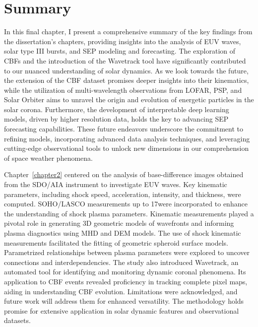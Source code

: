 \chapter{Summary}
\label{chapter5}
In this final chapter, I present a comprehensive summary of the key findings from the dissertation's chapters, providing insights into the analysis of EUV waves, solar type III bursts, and SEP modeling and forecasting. The exploration of CBFs and the introduction of the Wavetrack tool have significantly contributed to our nuanced understanding of solar dynamics. As we look towards the future, the extension of the CBF dataset promises deeper insights into their kinematics, while the utilization of multi-wavelength observations from LOFAR, PSP, and Solar Orbiter aims to unravel the origin and evolution of energetic particles in the solar corona. Furthermore, the development of interpretable deep learning models, driven by higher resolution data, holds the key to advancing SEP forecasting capabilities. These future endeavors underscore the commitment to refining models, incorporating advanced data analysis techniques, and leveraging cutting-edge observational tools to unlock new dimensions in our comprehension of space weather phenomena.

Chapter~\ref{chapter2} centered on the analysis of base-difference images obtained from the SDO/AIA instrument to investigate EUV waves. Key kinematic parameters, including shock speed, acceleration, intensity, and thickness, were computed. SOHO/LASCO measurements up to 17\rsun were incorporated to enhance the understanding of shock plasma parameters. Kinematic measurements played a pivotal role in generating 3D geometric models of wavefronts and informing plasma diagnostics using MHD and DEM models. The use of shock kinematic measurements facilitated the fitting of geometric spheroid surface models. Parametrized relationships between plasma parameters were explored to uncover connections and interdependencies. The study also introduced Wavetrack, an automated tool for identifying and monitoring dynamic coronal phenomena. Its application to CBF events revealed proficiency in tracking complete pixel maps, aiding in understanding CBF evolution. Limitations were acknowledged, and future work will address them for enhanced versatility. The methodology holds promise for extensive application in solar dynamic features and observational datasets.

